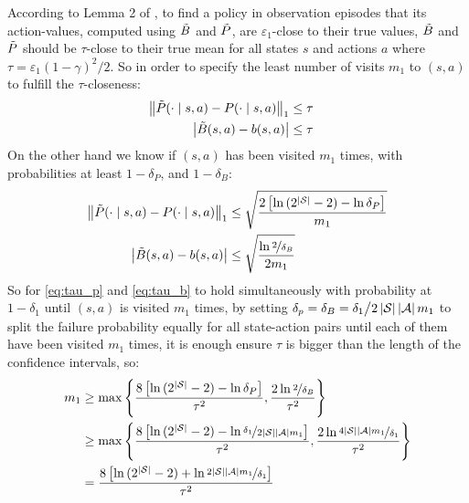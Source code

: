 According to Lemma 2 of \citet{strehl2008analysis}, to find a policy in observation episodes that its action-values, computed using $\tilde{B}$ and $\tilde{P}$, are $\varepsilon_1$-close to their true values, $\tilde{B}$ and $\tilde{P}$ should be $\tau$-close to their true mean for all states $s$ and actions $a$ where $\tau=\varepsilon_1(1 - \gamma)^2 \big/ 2$. So in order to specify the least number of visits $m_1$ to $(s, a)$ to fulfill the $\tau$-closeness:
%
\begin{align}
    \begin{split}
    \label{eq:tau_p}
    \left \lVert \tilde{P}(\cdot \mid s, a) - P(\cdot \mid s, a) \right \rVert_1 
    & \leq \tau 
    \end{split}
    \\
    \begin{split}
    \label{eq:tau_b}
    \left \lvert \tilde{B}(s, a) - b(s, a) \right \rvert & \leq \tau
    \end{split}
\end{align}
%
On the other hand we know if $(s, a)$ has been visited $m_1$ times, with probabilities at least $1  - \delta_P$, and $1 - \delta_B$:
%
\begin{align*}
    \left \lVert \tilde{P}(\cdot \mid s, a) - P(\cdot \mid s, a) \right \rVert_1 
    & \leq \sqrt{\frac{2\left[\ln{(2^{|\mathcal{S}|} - 2) - \ln{\delta_P}}\right]}{m_1}} \\
    \left \lvert \tilde{B}(s, a) - b(s, a) \right \rvert & \leq \sqrt{\frac{\ln{\nicefrac 2 {\delta_{B}}}}{2m_1}}
\end{align*}
%
So for \cref{eq:tau_p} and \cref{eq:tau_b} to hold simultaneously with probability at $1 - \delta_1$ until $(s, a)$ is visited $m_1$ times, by setting $\delta_p = \delta_B = \delta_1 \big/ 2\left \lvert \mathcal{S} \right \rvert\left \lvert \mathcal{A} \right \rvert m_1$ to split the failure probability equally for all state-action pairs until each of them have been visited $m_1$ times, it is enough ensure $\tau$ is bigger than the length of the confidence intervals, so:
%
\begin{align*}
        m_1 & \geq \max \left\{\frac{8\left[\ln{(2^{\left \lvert \mathcal{S} \right \rvert} - 2) - \ln{\delta_P}}\right]}{\tau^2}, \frac{2\ln{\nicefrac 2 {\delta_{B}}}}{\tau^2} \right\}
        \\
        & \geq \max \left\{\frac{8\left[\ln{(2^{\left \lvert \mathcal{S} \right \rvert} - 2) - \ln{\nicefrac{\delta_1}{2\left \lvert \mathcal{S} \right \rvert\left \lvert \mathcal{A} \right \rvert m_1}}}\right]}{\tau^2}, \frac{2\ln{\nicefrac {4\left \lvert \mathcal{S} \right \rvert\left \lvert \mathcal{A} \right \rvert m_1}{\delta_1}}}{\tau^2} \right\} 
        \\
        & = \frac{8\left[\ln{(2^{|\mathcal{S}|} - 2) + \ln{\nicefrac{2\left \lvert \mathcal{S} \right \rvert\left \lvert \mathcal{A} \right \rvert m_1}{\delta_1}}}\right]}{\tau^2}
    \end{align*}
